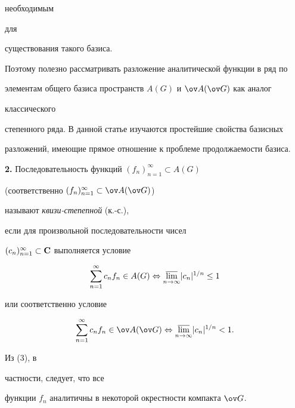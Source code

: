 необходимым 


для 


существования такого базиса. 


Поэтому полезно рассматривать разложение аналитической функции в ряд по 


элементам общего базиса пространств $A(G)$ и $\ov A(\ov G)$ как аналог 


классического 


степенного ряда. В данной статье изучаются простейшие свойства базисных 


разложений, имеющие прямое отношение к проблеме продолжаемости базиса. 


\medskip 


 


{\bf 2.} Последовательность функций $(f_n)^\infty_{n=1}\subset A(G)$ 


(соответственно $(f_n)^\infty_{n=1}\subset\ov A(\ov G)$) 


называют {\it квизи-степепной} (к.-с.), 


если для произвольной последовательности чисел 


$(c_n)^\infty_{n=1}\subset\bold C$ выполняется условие 


\begin{equation} 


\sum^\infty_{n=1}c_n f_n\in A(G)\Leftrightarrow 


\underset{n\to\infty}{\varlimsup}{}|c_n|^{1/n}\le1 


\end{equation} 


или соответственно условие 


\begin{equation} 


\sum^\infty_{n=1}c_n f_n\in\ov A(\ov G)\Leftrightarrow 


\underset{n\to\infty}{\varlimsup}{}|c_n|^{1/n}<1. 


\end{equation} 


 


\begin{note} Из (3), в 


частности, следует, что все 


функции $f_n$ аналитичны в некоторой окрестности компакта $\ov G$. 


\end{note} 


